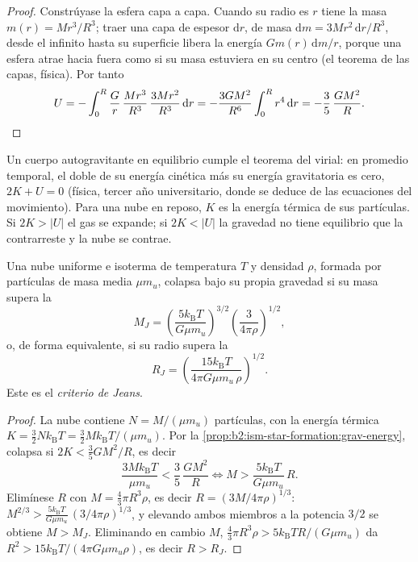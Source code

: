 \begin{proof}
Constrúyase la esfera capa a capa. Cuando su radio es $r$ tiene la masa
$m(r) = M r^3/R^3$; traer una capa de espesor $\mathrm dr$, de masa
$\mathrm dm = 3M r^2\,\mathrm dr/R^3$, desde el infinito hasta su superficie libera
la energía $G m(r)\,\mathrm dm/r$, porque una esfera atrae hacia fuera como si
su masa estuviera en su centro (el teorema de las capas, física). Por tanto
\[
  U = -\int_0^R \frac{G}{r}\,\frac{M r^3}{R^3}\,\frac{3 M r^2}{R^3}\,\mathrm dr
    = -\frac{3 G M^2}{R^6}\int_0^R r^4\,\mathrm dr = -\frac{3}{5}\,\frac{G M^2}{R}.
  \qedhere
\]
\end{proof}

Un cuerpo autogravitante en equilibrio cumple el teorema del virial: en promedio
temporal, el doble de su energía cinética más su energía gravitatoria es cero,
$2K + U = 0$ (física, tercer año universitario, donde se deduce de las
ecuaciones del movimiento). Para una nube en reposo, $K$ es la energía térmica de sus
partículas. Si $2K > |U|$ el gas se expande; si $2K < |U|$ la gravedad no tiene
equilibrio que la contrarreste y la nube se contrae.

\begin{proposition}\label{prop:b2:ism-star-formation:jeans}
Una nube uniforme e isoterma de temperatura $T$ y densidad $\rho$, formada por
partículas de masa media $\mu m_u$, colapsa bajo su propia gravedad si su masa
supera la \emph{}
\[
  M_J = \left(\frac{5 k_{\mathrm B} T}{G\mu m_u}\right)^{3/2}
        \left(\frac{3}{4\pi\rho}\right)^{1/2},
\]
o, de forma equivalente, si su radio supera la \emph{}
\[
  R_J = \left(\frac{15 k_{\mathrm B} T}{4\pi G\mu m_u\,\rho}\right)^{1/2}.
\]
Este es el \emph{criterio de Jeans}.
\end{proposition}

\begin{proof}
La nube contiene $N = M/(\mu m_u)$ partículas, con la energía térmica
$K = \tfrac32 N k_{\mathrm B}T = \tfrac32 M k_{\mathrm B}T/(\mu m_u)$. Por la
\cref{prop:b2:ism-star-formation:grav-energy}, colapsa si
$2K < \tfrac35 GM^2/R$, es decir
\[
  \frac{3 M k_{\mathrm B} T}{\mu m_u} < \frac{3}{5}\,\frac{G M^2}{R}
  \iff M > \frac{5 k_{\mathrm B} T}{G \mu m_u}\, R .
\]
Elimínese $R$ con $M = \tfrac43\pi R^3\rho$, es decir $R = (3M/4\pi\rho)^{1/3}$:
$M^{2/3} > \frac{5 k_{\mathrm B}T}{G\mu m_u}\,(3/4\pi\rho)^{1/3}$, y elevando
ambos miembros a la potencia $3/2$ se obtiene $M > M_J$. Eliminando en cambio $M$,
$\tfrac43\pi R^3\rho > 5 k_{\mathrm B}T R/(G\mu m_u)$ da $R^2 > 15
k_{\mathrm B}T/(4\pi G\mu m_u\rho)$, es decir $R > R_J$.
\end{proof}


